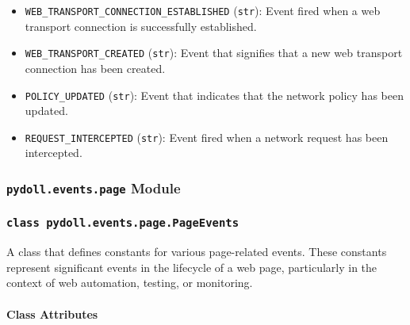 \documentclass{article}
\begin{document}
\begin{itemize}
    \item \lstinline[style=pythonstyle]|WEB_TRANSPORT_CONNECTION_ESTABLISHED| (\lstinline[style=pythonstyle]|str|): Event fired when a web transport connection is successfully established.
    \item \lstinline[style=pythonstyle]|WEB_TRANSPORT_CREATED| (\lstinline[style=pythonstyle]|str|): Event that signifies that a new web transport connection has been created.
    \item \lstinline[style=pythonstyle]|POLICY_UPDATED| (\lstinline[style=pythonstyle]|str|): Event that indicates that the network policy has been updated.
    \item \lstinline[style=pythonstyle]|REQUEST_INTERCEPTED| (\lstinline[style=pythonstyle]|str|): Event fired when a network request has been intercepted.
\end{itemize}

\subsubsection*{\texttt{pydoll.events.page} Module}

\subsubsection*{\texttt{class pydoll.events.page.PageEvents}}
\noindent A class that defines constants for various page-related events. These constants represent significant events in the lifecycle of a web page, particularly in the context of web automation, testing, or monitoring.

\paragraph{Class Attributes}
\end{document}
